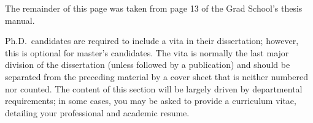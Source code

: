 %
%
%

\begin{vita}
  The remainder
  of this page was taken from page 13
  of the Grad School's thesis manual.

  Ph.D.~candidates are required to include a vita in their dissertation;
  however,
  this is optional for master's candidates.
  The vita is normally the last major division
  of the dissertation
  (unless followed by a publication)
  and should be separated from the preceding material
  by a cover sheet that is neither numbered nor counted.
  The content of this section will be largely driven
  by departmental requirements;
  in some cases,
  you may be asked to provide a curriculum vitae,
  detailing your professional and academic resume.
\end{vita}